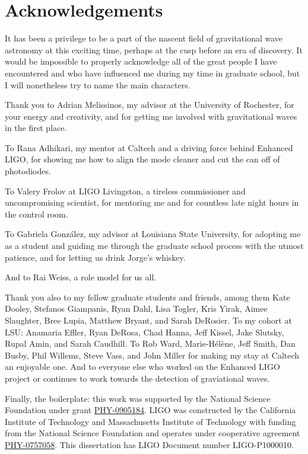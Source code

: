 \chapter*{Acknowledgements}

It has been a privilege to be a part of the nascent field of
gravitational wave astronomy at this exciting time, perhaps at the
cusp before an era of discovery.  It would be impossible to properly
acknowledge all of the great people I have encountered and who have
influenced me during my time in graduate school, but I will nonetheless
try to name the main characters.

Thank you to Adrian Melissinos, my advisor at the University of
Rochester, for your energy and creativity, and for getting me involved
with gravitational waves in the first place.  

To Rana Adhikari, my mentor at Caltech and a driving force behind
Enhanced LIGO, for showing me how to align the mode cleaner and cut
the can off of photodiodes.

To Valery Frolov at LIGO Livingston, a tireless commissioner and
uncompromising scientist, for mentoring me and for countless late
night hours in the control room.

To Gabriela Gonz\'alez, my advisor at Louisiana State University, for
adopting me as a student and guiding me through the graduate school
process with the utmost patience, and for letting us drink Jorge's
whiskey.

And to Rai Weiss, a role model for us all.

Thank you also to my fellow graduate students and friends, among them
Kate Dooley, Stefanos Giampanis, Ryan Dahl, Lisa Togler, Kris Yirak,
Aimee Slaughter, Bree Lupia, Matthew Bryant, and Sarah DeRosier.  To
my cohort at LSU: Anamaria Effler, Ryan DeRosa, Chad Hanna, Jeff
Kissel, Jake Slutsky, Rupal Amin, and Sarah Caudhill.  To Rob Ward,
Marie-H\'el\`ene, Jeff Smith, Dan Busby, Phil Willems, Steve Vass, and
John Miller for making my stay at Caltech an enjoyable one.  And to
everyone else who worked on the Enhanced LIGO project or continues to
work towards the detection of graviational waves.


Finally, the boilerplate: this work was supported by the National
Science Foundation under grant
\href{http://www.nsf.gov/awardsearch/showAward.do?AwardNumber=0905184}{PHY-0905184}.
LIGO was constructed by the California Institute of Technology and
Massachusetts Institute of Technology with funding from the National
Science Foundation and operates under cooperative agreement
\href{http://www.nsf.gov/awardsearch/showAward.do?AwardNumber=0757058}{PHY-0757058}.
This dissertation has LIGO Document number LIGO-P1000010.

